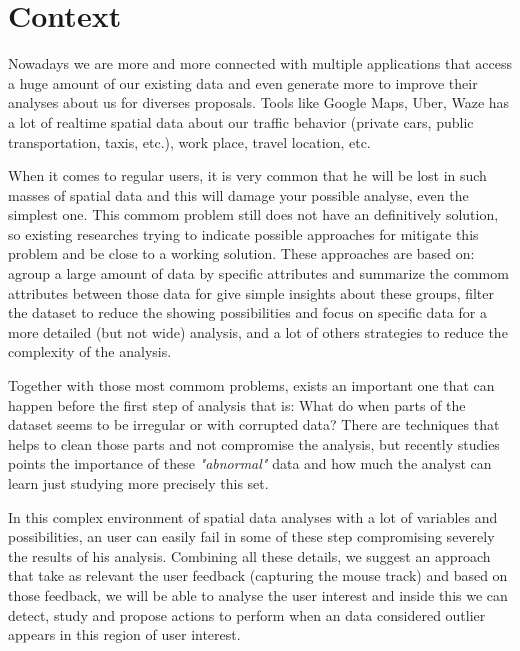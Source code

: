 \section{Context}

Nowadays we are more and more connected with multiple applications that access a huge
amount of our existing data and even generate more to improve their analyses about
us for diverses proposals. Tools like Google Maps, Uber, Waze has a lot of realtime
spatial data about our traffic behavior (private cars, public transportation, taxis,
etc.), work place, travel location, etc.

When it comes to regular users, it is very common that he will be lost in such masses
of spatial data and this will damage your possible analyse, even the simplest one.
This commom problem still does not have an definitively solution, so existing researches
trying to indicate possible approaches for mitigate this problem and be close to a
working solution. These approaches are based on: agroup a large amount of data by specific
attributes and summarize the commom attributes between those data for give simple
insights about these groups, filter the dataset to reduce the showing possibilities and
focus on specific data for a more detailed (but not wide) analysis, and a lot of others
strategies to reduce the complexity of the analysis.

Together with those most commom problems, exists an important one that can happen before
the first step of analysis that is: What do when parts of the dataset seems to be irregular
or with corrupted data? There are techniques that helps to clean those parts and not compromise
the analysis,
but recently studies points the importance of these \textit{"abnormal"} data and how much
the analyst can learn just studying more precisely this set. \cite{DBLP:journals/debu/FreireCVZ16}

In this complex environment of spatial data analyses with a lot of variables and possibilities,
an user can easily fail in some of these step compromising severely the results of his analysis.
Combining all these details, we suggest an approach that take as relevant the user feedback
(capturing the mouse track) and based on those feedback, we will be able to analyse the user
interest and inside this we can detect, study and propose actions to perform when an data considered
outlier appears in this region of user interest.

